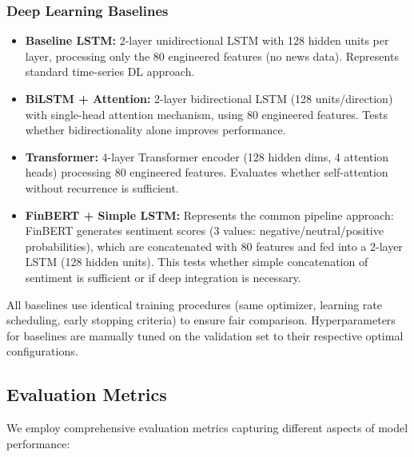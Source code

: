 \documentclass[conference]{IEEEtran}
\begin{document}
\subsubsection{Deep Learning Baselines}
\begin{itemize}
\item \textbf{Baseline LSTM:} 2-layer unidirectional LSTM with 128 hidden units per layer, processing only the 80 engineered features (no news data). Represents standard time-series DL approach.

\item \textbf{BiLSTM + Attention:} 2-layer bidirectional LSTM (128 units/direction) with single-head attention mechanism, using 80 engineered features. Tests whether bidirectionality alone improves performance.

\item \textbf{Transformer:} 4-layer Transformer encoder (128 hidden dims, 4 attention heads) processing 80 engineered features. Evaluates whether self-attention without recurrence is sufficient.

\item \textbf{FinBERT + Simple LSTM:} Represents the common pipeline approach: FinBERT generates sentiment scores (3 values: negative/neutral/positive probabilities), which are concatenated with 80 features and fed into a 2-layer LSTM (128 hidden units). This tests whether simple concatenation of sentiment is sufficient or if deep integration is necessary.
\end{itemize}

All baselines use identical training procedures (same optimizer, learning rate scheduling, early stopping criteria) to ensure fair comparison. Hyperparameters for baselines are manually tuned on the validation set to their respective optimal configurations.

\subsection{Evaluation Metrics}

We employ comprehensive evaluation metrics capturing different aspects of model performance:
\end{document}
